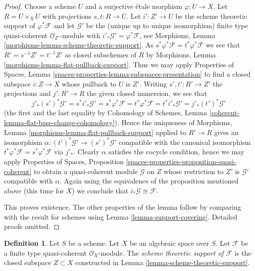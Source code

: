 \documentclass{stacks-project}
\theoremstyle{plain}
\theoremstyle{definition}
\newtheorem{definition}[subsection]{Definition}
\theoremstyle{remark}
\numberwithin{equation}{subsection}
\begin{document}
\begin{proof}
Choose a scheme $U$ and a surjective \'etale morphism $\varphi : U \to X$.
Let $R = U \times_X U$ with projections $s, t : R \to U$.
Let $i' : Z' \to U$ be the scheme theoretic support of $\varphi^*\mathcal{F}$
and let $\mathcal{G}'$ be the (unique up to unique isomorphism)
finite type quasi-coherent $\mathcal{O}_{Z'}$-module
with $i'_*\mathcal{G}' = \varphi^*\mathcal{F}$, see
Morphisms, Lemma \ref{morphisms-lemma-scheme-theoretic-support}.
As $s^*\varphi^*\mathcal{F} = t^*\varphi^*\mathcal{F}$ we see that
$R' = s^{-1}Z' = t^{-1}Z'$ as closed subschemes of $R$ by
Morphisms, Lemma \ref{morphisms-lemma-flat-pullback-support}.
Thus we may apply Properties of Spaces, Lemma
\ref{spaces-properties-lemma-subspaces-presentation}
to find a closed subspace $i : Z \to X$ whose pullback to $U$ is $Z'$.
Writing $s', t' : R' \to Z'$ the projections and
$j' : R' \to R$ the given closed immersion, we see that
$$
j'_* (s')^*\mathcal{G}' = s^* i'_*\mathcal{G}' =
s^*\varphi^*\mathcal{F} = t^*\varphi^*\mathcal{F} =
t^*i'_*\mathcal{G}' = j'_*(t')^*\mathcal{G}'
$$
(the first and the last equality by Cohomology of Schemes,
Lemma \ref{coherent-lemma-flat-base-change-cohomology}).
Hence the uniqueness of
Morphisms, Lemma \ref{morphisms-lemma-flat-pullback-support}
applied to $R' \to R$ gives an isomorphism
$\alpha : (t')^*\mathcal{G}' \to (s')^*\mathcal{G}'$
compatible with the canonical isomorphism
$t^*\varphi^*\mathcal{F} = s^*\varphi^*\mathcal{F}$
via $j'_*$. Clearly $\alpha$ satisfies the cocycle condition, hence
we may apply
Properties of Spaces, Proposition
\ref{spaces-properties-proposition-quasi-coherent}
to obtain a quasi-coherent module $\mathcal{G}$ on $Z$ whose restriction
to $Z'$ is $\mathcal{G}'$ compatible with $\alpha$.
Again using the equivalence of the proposition mentioned above
(this time for $X$) we conclude that $i_*\mathcal{G} \cong \mathcal{F}$.

\medskip\noindent
This proves existence. The other properties of the lemma follow
by comparing with the result for schemes using
Lemma \ref{lemma-support-covering}.
Detailed proofs omitted.
\end{proof}

\begin{definition}
\label{definition-scheme-theoretic-support}
Let $S$ be a scheme. Let $X$ be an algebraic space over $S$.
Let $\mathcal{F}$ be a finite type quasi-coherent $\mathcal{O}_X$-module.
The {\it scheme theoretic support of $\mathcal{F}$} is the closed subspace
$Z \subset X$ constructed in Lemma \ref{lemma-scheme-theoretic-support}.
\end{definition}
\end{document}

